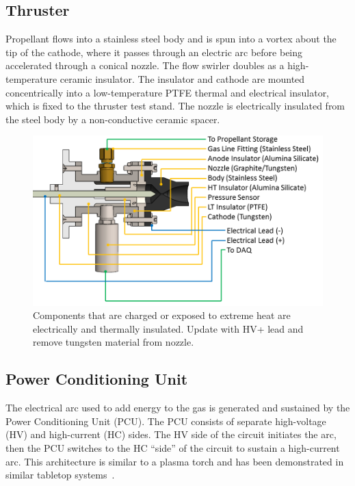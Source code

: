\documentclass[journal]{IEEEtran}
\begin{document}
\subsection{Thruster}
Propellant flows into a stainless steel body and is spun into a vortex about the tip of the cathode, where it passes through an electric arc before being accelerated through a conical nozzle.
The flow swirler doubles as a high-temperature ceramic insulator.
The insulator and cathode are mounted concentrically into a low-temperature PTFE thermal and electrical insulator, which is fixed to the thruster test stand.
The nozzle is electrically insulated from the steel body by a non-conductive ceramic spacer.
\begin{figure}[htp]
  \centering
  \includegraphics[width=\linewidth]{figs/cutaway_annotated.png}
  \caption[P17101 Arcjet Annotated Cutaway]{Components that are charged or exposed to extreme heat are electrically and thermally insulated. {\color{red}Update with HV+ lead and remove tungsten material from nozzle.}
\label{fig:annotated-cutaway}
}
\end{figure}

\subsection{Power Conditioning Unit}
The electrical arc used to add energy to the gas is generated and sustained by the Power Conditioning Unit (PCU).
The PCU consists of separate high-voltage (HV) and high-current (HC) sides.
The HV side of the circuit initiates the arc, then the PCU switches to the HC ``side'' of the circuit to sustain a high-current arc.
This architecture is similar to a plasma torch and has been demonstrated in similar tabletop systems~\cite{park2015thesis}.
\end{document}
